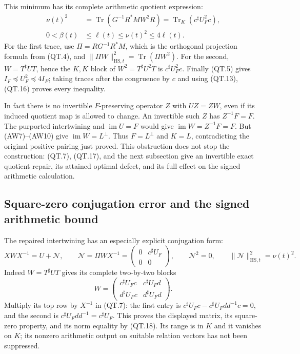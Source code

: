 This minimum has its complete arithmetic quotient expression:
\[
 \begin{split}
 \nu(t)^2
 &=\operatorname{Tr}\!\left(G^{-1}R^*MW^2R\right)
   =\operatorname{Tr}_K(c^\sharp U_F^2c),\\
 0<\beta(t)&\le\ell(t)\le\nu(t)^2\le4\ell(t).
 \end{split}
 \tag{QT.18}\label{CFStage:eq:qt-minimumenergy}
\]
For the first trace, use \(\Pi=RG^{-1}R^*M\), which is the
orthogonal projection formula from (QT.4), and
\(\|\Pi W\|_{\mathrm{HS},t}^2=\operatorname{Tr}(\Pi W^2)\).
For the second, \(W=T^\sharp UT\), hence
the \(K,K\) block of \(W^2=T^\sharp U^2T\) is \(c^\sharp U_F^2c\).
Finally (QT.5) gives
\(I_F\preceq U_F^2\preceq4I_F\); taking traces after the congruence
by \(c\) and using (QT.13), (QT.16) proves every inequality.

In fact there is no invertible \(F\)-preserving operator \(Z\) with
\(UZ=ZW\), even if its induced quotient map is allowed to change.
An invertible such \(Z\) has \(Z^{-1}F=F\).
The purported intertwining and \(\operatorname{im}U=F\) would give
\(\operatorname{im}W=Z^{-1}F=F\).
But (AW7)--(AW10) give \(\operatorname{im}W=L^\perp\).
Thus \(F=L^\perp\) and \(K=L\), contradicting the original positive
pairing just proved. This obstruction does not stop the construction:
(QT.7), (QT.17), and the next subsection give an invertible exact
quotient repair, its attained optimal defect, and its full effect on
the signed arithmetic calculation.

\subsection{Square-zero conjugation error and the signed arithmetic bound}

The repaired intertwining has an especially explicit conjugation form:
\[
 XWX^{-1}=U+\mathcal N,\qquad
 \mathcal N=\Pi WX^{-1}
   =\begin{pmatrix}0&c^\sharp U_F\\0&0\end{pmatrix},
 \qquad \mathcal N^2=0,\qquad
 \|\mathcal N\|_{\mathrm{HS},t}^2=\nu(t)^2.
 \tag{QT.19}\label{CFStage:eq:qt-nilpotent}
\]
Indeed \(W=T^\sharp UT\) gives its complete two-by-two blocks
\[
 W=
 \begin{pmatrix}
  c^\sharp U_Fc&c^\sharp U_Fd\\
  d^\sharp U_Fc&d^\sharp U_Fd
 \end{pmatrix}.
 \]
Multiply its top row by \(X^{-1}\) in (QT.7): the first entry is
\(c^\sharp U_Fc-c^\sharp U_Fdd^{-1}c=0\), and the second is
\(c^\sharp U_Fdd^{-1}=c^\sharp U_F\).
This proves the displayed matrix, its square-zero property, and its
norm equality by (QT.18). Its range is in \(K\) and it vanishes on
\(K\); its nonzero arithmetic output on suitable relation vectors
has not been suppressed.

